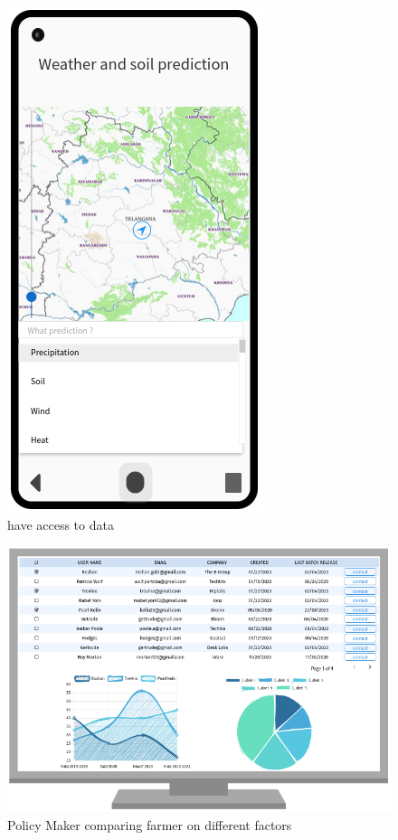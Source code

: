 \begin{figure}[H]
\begin{minipage}{0.48\textwidth}
		\includegraphics[width=0.6\columnwidth]{Images/meteo.png}
		\caption{have access to data}
		\label{Fig:interface_meteo}
	\end{minipage}\hfill
\end{figure}
\begin{figure}[H]
	\centering
	\includegraphics[width=0.8\columnwidth]{Images/visualize_farmers.png}
	\caption{Policy Maker comparing farmer on different factors}
	\label{Fig:interface_visu_farmers}
\end{figure}

